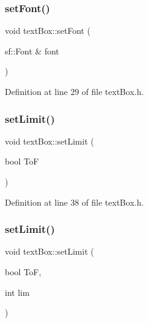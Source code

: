 \subsubsection{\texorpdfstring{set\+Font()}{setFont()}}
{\footnotesize\ttfamily void text\+Box\+::set\+Font (\begin{DoxyParamCaption}\item[{sf\+::\+Font \&}]{font }\end{DoxyParamCaption})\hspace{0.3cm}{\ttfamily [inline]}}



Definition at line 29 of file text\+Box.\+h.

\mbox{\label{classtext_box_a481f81251c418b55fe78e230fcc1bc75}} 
\subsubsection{\texorpdfstring{set\+Limit()}{setLimit()}\hspace{0.1cm}{\footnotesize\ttfamily [1/2]}}
{\footnotesize\ttfamily void text\+Box\+::set\+Limit (\begin{DoxyParamCaption}\item[{bool}]{ToF }\end{DoxyParamCaption})\hspace{0.3cm}{\ttfamily [inline]}}



Definition at line 38 of file text\+Box.\+h.

\mbox{\label{classtext_box_adbcf45bbab4faadc172e419da752484b}} 
\subsubsection{\texorpdfstring{set\+Limit()}{setLimit()}\hspace{0.1cm}{\footnotesize\ttfamily [2/2]}}
{\footnotesize\ttfamily void text\+Box\+::set\+Limit (\begin{DoxyParamCaption}\item[{bool}]{ToF,  }\item[{int}]{lim }\end{DoxyParamCaption})\hspace{0.3cm}{\ttfamily [inline]}}



